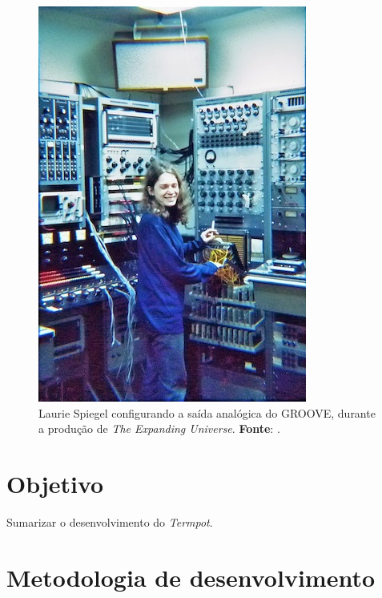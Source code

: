 \begin{figure}[!h]
  \begin{center}
  \includegraphics[scale=0.5]{./spiegel.jpg}
  \caption{\small Laurie Spiegel configurando a saída analógica do GROOVE, durante a produção de \emph{The Expanding Universe}. \textbf{Fonte}: \cite{spiegel_expanding_1975}.}
  \label{fig:groove}
  \end{center}
\end{figure}

\section{Objetivo}

\normalsize Sumarizar o desenvolvimento do \emph{Termpot}.


\section{Metodologia de desenvolvimento}

